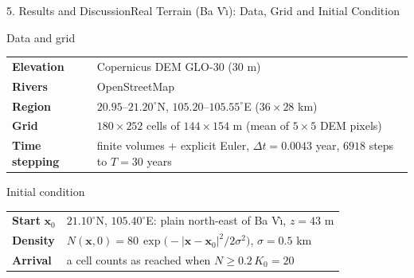\documentclass[10pt]{beamer}
\begin{document}
    \begin{frame}{5. Results and Discussion}{Real Terrain (Ba V\`{\i}): Data, Grid and Initial Condition}
      \begin{block}{Data and grid}
          \small
          \renewcommand{\arraystretch}{1.25}
          \begin{tabular}{@{}p{2.4cm} p{7.7cm}@{}}
            \textbf{Elevation} & Copernicus DEM GLO-30 (30 m) \\
            \textbf{Rivers} & OpenStreetMap \\
            \textbf{Region} & $20.95$--$21.20^\circ$N, \; $105.20$--$105.55^\circ$E \quad ($36 \times 28$ km) \\
            \textbf{Grid} & $180 \times 252$ cells of $144 \times 154$ m (mean of $5 \times 5$ DEM pixels) \\
            \textbf{Time stepping} & finite volumes + explicit Euler, \; $\Delta t = 0.0043$ year, \; $6918$ steps to $T = 30$ years \\
          \end{tabular}
      \end{block}
      \begin{block}{Initial condition}
          \small
          \renewcommand{\arraystretch}{1.25}
          \begin{tabular}{@{}p{2.4cm} p{7.7cm}@{}}
            \textbf{Start} $\mathbf{x}_0$ & $21.10^\circ$N, $105.40^\circ$E: plain north-east of Ba V\`{\i}, \; $z = 43$ m \\
            \textbf{Density} & $N(\mathbf{x}, 0) = 80\, \exp\big(-|\mathbf{x} - \mathbf{x}_0|^2 / 2\sigma^2\big)$, \quad $\sigma = 0.5$ km \\
            \textbf{Arrival} & a cell counts as reached when $N \ge 0.2\,K_0 = 20$ \\
          \end{tabular}
      \end{block}
    \end{frame}
\end{document}
